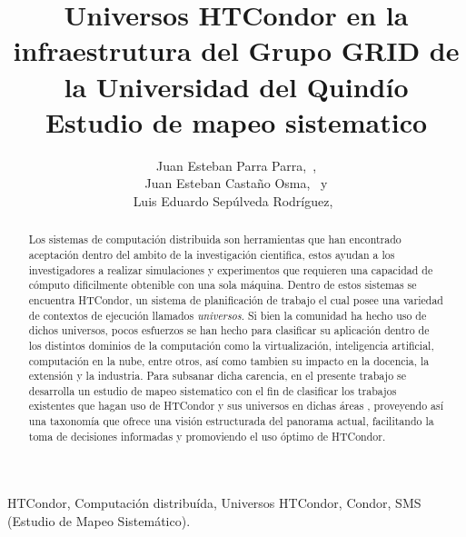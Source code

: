 \documentclass[journal]{IEEEtran}
\begin{document}
\title{
	Universos HTCondor en la infraestrutura del Grupo GRID de la
	Universidad del Quindío \\
	Estudio de mapeo sistematico
}

\author{
	Juan Esteban Parra Parra,~, \\
	Juan Esteban Castaño Osma,~ y \\
	Luis Eduardo Sepúlveda Rodríguez,~
}



\maketitle

\begin{abstract}
	Los sistemas de computación distribuida son herramientas que han encontrado aceptación dentro del ambito de la investigación cientifica,
	estos ayudan a los investigadores a realizar simulaciones y experimentos que requieren una capacidad de cómputo
	dificilmente obtenible con una sola máquina. Dentro de estos sistemas se encuentra HTCondor, un sistema de planificación de trabajo el cual posee una
	variedad de contextos de ejecución llamados  \textit{universos}. Si bien la comunidad ha hecho uso de dichos universos,
	pocos esfuerzos se han hecho para clasificar su aplicación dentro de los distintos dominios de la computación como
	la virtualización, inteligencia artificial, computación en la nube, entre otros,
	así como tambien su impacto en la docencia, la extensión y la industria. Para subsanar dicha carencia, en el presente
	trabajo se desarrolla un estudio de mapeo sistematico con el fin de clasificar los trabajos existentes que hagan uso de HTCondor y sus universos
	en dichas áreas , proveyendo así una taxonomía que ofrece una visión estructurada del panorama actual,
	facilitando la toma de decisiones informadas y promoviendo el uso óptimo de HTCondor.

\end{abstract}


\begin{IEEEkeywords}
	HTCondor, Computación distribuída, Universos HTCondor, Condor, SMS (Estudio de Mapeo Sistemático).
\end{IEEEkeywords}
\end{document}
